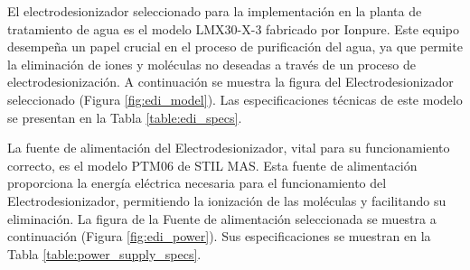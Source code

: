 El electrodesionizador seleccionado para la implementación en la planta de tratamiento de agua es el modelo LMX30-X-3 fabricado por Ionpure. Este equipo desempeña un papel crucial en el proceso de purificación del agua, ya que permite la eliminación de iones y moléculas no deseadas a través de un proceso de electrodesionización. A continuación se muestra la figura del Electrodesionizador seleccionado (Figura \ref{fig:edi_model}). Las especificaciones técnicas de este modelo se presentan en la Tabla \ref{table:edi_specs}.



La fuente de alimentación del Electrodesionizador, vital para su funcionamiento correcto, es el modelo PTM06 de STIL MAS. Esta fuente de alimentación proporciona la energía eléctrica necesaria para el funcionamiento del Electrodesionizador, permitiendo la ionización de las moléculas y facilitando su eliminación. La figura de la Fuente de alimentación seleccionada se muestra a continuación (Figura \ref{fig:edi_power}). Sus especificaciones se muestran en la Tabla \ref{table:power_supply_specs}.




